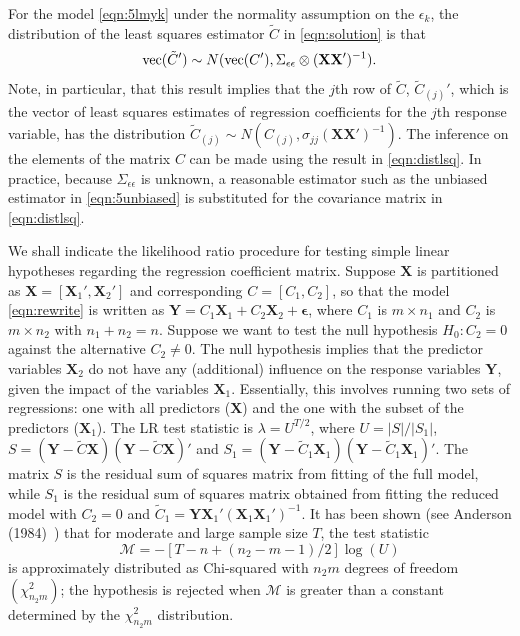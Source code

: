\setcounter{result}{0}
\begin{result} \label{res:1}
For the model \eqref{eqn:5lmyk} under the normality assumption on the $\epsilon_k$,  the distribution of the least squares estimator $\tilde{C}$ in \eqref{eqn:solution} is that 
	\begin{equation} \label{eqn:distlsq}
	\tvec(\tilde{C}') \sim N(\tvec(C'), \Sigma_{\epsilon\epsilon} \otimes (\mathbf{X} \mathbf{X}')^{-1}).
	\end{equation}
Note, in particular, that this result implies that the $j$th row of $\tilde{C}$, $\tilde{C}_{(j)}'$, which is the vector of least squares estimates of regression coefficients for the $j$th response variable, has the distribution $\tilde{C}_{(j)} \sim N(C_{(j)}, \sigma_{jj}( \mathbf{X} \mathbf{X}')^{-1} )$. The inference on the elements of the matrix $C$ can be made using the result in \eqref{eqn:distlsq}. In practice, because $\Sigma_{\epsilon\epsilon}$ is unknown, a reasonable estimator such as the unbiased estimator in \eqref{eqn:5unbiased} is substituted for the covariance matrix in \eqref{eqn:distlsq}.


We shall indicate the likelihood ratio procedure for testing simple linear hypotheses regarding the regression coefficient matrix. Suppose $\mathbf{X}$ is partitioned as $\mathbf{X}= [\mathbf{X}_1', \mathbf{X}_2']$ and corresponding $C= [C_1, C_2]$, so that the model \eqref{eqn:rewrite} is written as $\mathbf{Y}= C_1 \mathbf{X}_1 + C_2 \mathbf{X}_2 + \mathbf{\epsilon}$, where $C_1$ is $m \times n_1$ and $C_2$ is $m \times n_2$ with $n_1 + n_2= n$. Suppose we want to test the null hypothesis $H_0: C_2= 0$ against the alternative $C_2 \neq 0$. The null hypothesis implies that the predictor variables $\mathbf{X}_2$ do not have any (additional) influence on the response variables $\mathbf{Y}$, given the impact of the variables $\mathbf{X}_1$. Essentially, this involves running two sets of regressions: one with all predictors ($\mathbf{X}$) and the one with the subset of the predictors ($\mathbf{X}_1$). The LR test statistic is $\lambda= U^{T/2}$, where $U= \lvert S\rvert / \lvert S_1 \rvert$, $S= (\mathbf{Y} - \tilde{C} \mathbf{X} )(\mathbf{Y} - \tilde{C} \mathbf{X} )'$ and $S_1= (\mathbf{Y}-\tilde{C}_1 \mathbf{X}_1 )( \mathbf{Y} - \tilde{C}_1 \mathbf{X}_1 )'$. The matrix $S$ is the residual sum of squares matrix from fitting of the full model, while $S_1$ is the residual sum of squares matrix obtained from fitting the reduced model with $C_2=0$ and $\tilde{C}_1= \mathbf{Y} \mathbf{X}_1' (\mathbf{X}_1 \mathbf{X}_1')^{-1}$. It has been shown (see Anderson (1984)~\cite[Chap. 8]{andersontw2}) that for moderate and large sample size $T$, the test statistic 
	\begin{equation} \label{eqn:mathcal}
	\mathcal{M}= -[T - n + (n_2 - m - 1)/2] \log(U)
	\end{equation}
is approximately distributed as Chi-squared with $n_2 m$ degrees of freedom $(\chi_{n_2m}^2)$; the hypothesis is rejected when $\mathcal{M}$ is greater than a constant determined by the $\chi_{n_2m}^2$ distribution. 
\end{result}


